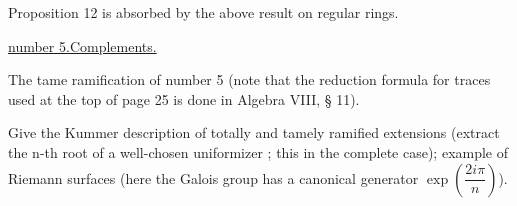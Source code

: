 Proposition 12 is absorbed by the above result on regular rings.

\uline{number 5.}\quad \uline{Complements.}

The tame ramification of number 5 (note that the reduction formula for traces used at the top of page 25 is done in Algebra VIII, § 11).

Give the Kummer description of totally and tamely ramified extensions (extract the n-th root of a well-chosen uniformizer ; this in the complete case); example of Riemann surfaces (here the Galois group has a canonical generator $\exp\left(\dfrac{2i\pi}{n}\right)$).

